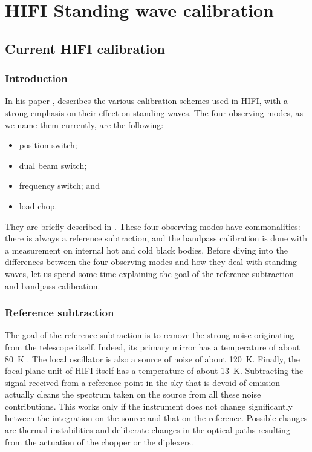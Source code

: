 \cleardoublepage
\chapter{HIFI Standing wave calibration}

\section{Current HIFI calibration}

\subsection{Introduction}
In his paper  \cite{ossenkopf2002intensity}, \citeauthor{ossenkopf2002intensity} describes the various calibration schemes used in HIFI, with a strong emphasis on their effect on standing waves.
The four observing modes, as we name them currently, are the following:
\begin{itemize}
    \item position switch;
    \item dual beam switch;
    \item frequency switch; and
    \item load chop.
\end{itemize}
They are briefly described in  \cite{AA_537_A17}.
These four observing modes have commonalities: there is always a reference subtraction, and the bandpass calibration is done with a measurement on internal hot and cold black bodies.
Before diving into the differences between the four observing modes and how they deal with standing waves, let us spend some time explaining the goal of the reference subtraction and bandpass calibration.

\subsection{Reference subtraction}
The goal of the reference subtraction is to remove the strong noise originating from the telescope itself.
Indeed, its primary mirror has a temperature of about \SI{80}{\kelvin} \cite{Sein2004mirror}.
The local oscillator is also a source of noise of about \SI{120}{\kelvin}.
Finally, the focal plane unit of HIFI itself has a temperature of about \SI{13}{\kelvin}.
Subtracting the signal received from a reference point in the sky that is devoid of emission actually cleans the spectrum taken on the source from all these noise contributions.
This works only if the instrument does not change significantly between the integration on the source and that on the reference.
Possible changes are thermal instabilities and deliberate changes in the optical paths resulting from the actuation of the chopper or the diplexers.

